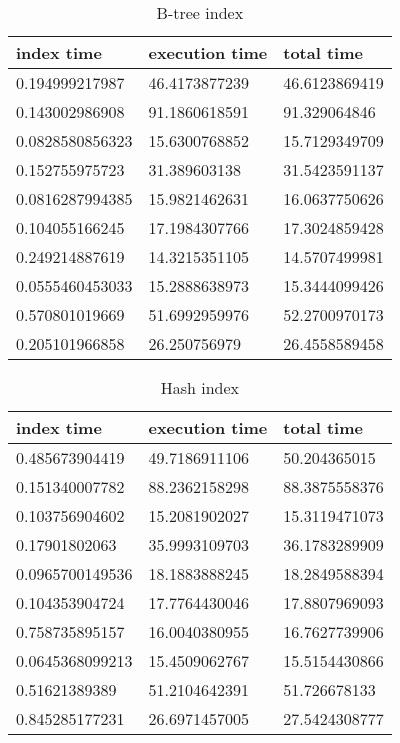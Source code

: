 \begin{itemize*}
\begin{table}[H]
\begin{center}
\begin{tabular}{|l|l|l|}
\hline
index time & execution time & total time                \\ \hline
0.194999217987  & 46.4173877239 & 46.6123869419 \\ \hline
0.143002986908  & 91.1860618591 & 91.329064846  \\ \hline
0.0828580856323 & 15.6300768852 & 15.7129349709 \\ \hline
0.152755975723  & 31.389603138  & 31.5423591137 \\ \hline
0.0816287994385 & 15.9821462631 & 16.0637750626 \\ \hline
0.104055166245  & 17.1984307766 & 17.3024859428 \\ \hline
0.249214887619  & 14.3215351105 & 14.5707499981 \\ \hline
0.0555460453033 & 15.2888638973 & 15.3444099426 \\ \hline
0.570801019669  & 51.6992959976 & 52.2700970173 \\ \hline
0.205101966858  & 26.250756979  & 26.4558589458 \\ \hline
\end{tabular}
\end{center}
\caption{B-tree index}
\end{table}

\begin{table}[H]
\begin{center}
\begin{tabular}{|l|l|l|}
\hline
index time & execution time & total time     \\ \hline
0.485673904419  & 49.7186911106 & 50.204365015  \\ \hline
0.151340007782  & 88.2362158298 & 88.3875558376 \\ \hline
0.103756904602  & 15.2081902027 & 15.3119471073 \\ \hline
0.17901802063   & 35.9993109703 & 36.1783289909 \\ \hline
0.0965700149536 & 18.1883888245 & 18.2849588394 \\ \hline
0.104353904724  & 17.7764430046 & 17.8807969093 \\ \hline
0.758735895157  & 16.0040380955 & 16.7627739906 \\ \hline
0.0645368099213 & 15.4509062767 & 15.5154430866 \\ \hline
0.51621389389   & 51.2104642391 & 51.726678133  \\ \hline
0.845285177231  & 26.6971457005 & 27.5424308777 \\ \hline
\end{tabular}
\end{center}
\caption{Hash index}
\end{table}


\end{itemize*}
